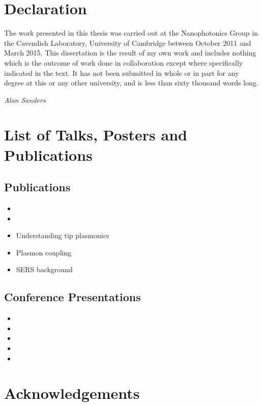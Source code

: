 \documentclass{article}
\begin{document}
\section*{Declaration}
The work presented in this thesis was carried out at the Nanophotonics Group in the Cavendish Laboratory, University of Cambridge between October 2011 and March 2015. This dissertation is the result of my own work and includes nothing which is the outcome of work done in collaboration except where specifically indicated in the text. It has not been submitted in whole or in part for any degree at this or any other university, and is less than sixty thousand words long.

{\flushright\emph{Alan Sanders}\par}

\section*{List of Talks, Posters and Publications}
\subsection*{Publications}
\begin{itemize}
\item {}
\item {}
\item Understanding tip plasmonics
\item Plasmon coupling
\item SERS background
\end{itemize}

\subsection*{Conference Presentations}
\begin{itemize}
\item {}
\item {}
\item {}
\item {}
\item {}
\end{itemize}

\newpage
\section*{Acknowledgements}
\end{document}
